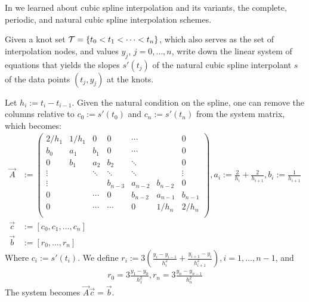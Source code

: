 
\begin{problem} \label{prb:NatCubicSplines}
  In  we learned about cubic spline interpolation and its variants,
  the complete, periodic, and natural cubic spline interpolation schemes. 
  
  \begin{subproblem}[1]
    \label{csi:sp1}
    Given a knot set {${\cal T}=\{t_{0}<t_{1}<\dots<t_{n}\}$}, which also serves
    as the set of interpolation nodes, and values {$y_{j}$},
    {$j=0,\ldots,n$}, write down the linear system of equations that yields
    the slopes $s'(t_{j})$ of the natural cubic spline interpolant $s$ of the data
    points $(t_{j},y_{j})$ at the knots.
    
  \begin{solution}
   Let $h_i := t_i - t_{i-1}$. Given the natural condition on the spline, one can remove the columns relative to $c_0 := s'(t_0)$ and $c_n := s'(t_n)$ from the system matrix, which becomes:
   \newcommand{\squarelineheight}{0.9ex}
   \begin{align}
    \vec{A} & := \begin{pmatrix}
                2 / h_1 & 1 / h_1 & 0 & 0 & \cdots & & 0 \\[\squarelineheight]
                b_0 & a_1 & b_1 & 0 & \cdots & & 0 \\[\squarelineheight]
                0 & b_1 & a_2 & b_2 & \ddots & & 0 \\[\squarelineheight]
                \vdots & & \ddots & \ddots & \ddots & & \vdots \\[\squarelineheight]
                \vdots & &  & b_{n-3} & a_{n-2} & b_{n-2} & 0 \\[\squarelineheight]
                0 & & \cdots & 0 & b_{n-2} & a_{n-1} & b_{n-1} \\[\squarelineheight]
                0 & & \cdots & \cdots & 0 & 1 / h_n & 2 / h_n \\
               \end{pmatrix}, a_i := \frac{2}{h_i} + \frac{2}{h_{i+1}}, b_i := \frac{1}{h_{i+1}} \\
    \vec{c} & := [ c_0, c_1, \dots, c_{n} ] \\
    \vec{b} & := [ r_0, \dots, r_{n} ]
   \end{align}
  Where $c_i := s'(t_i)$. We define $r_i := 3 \left( \frac{y_{i} - y_{i-1}}{h_{i}^2} + \frac{y_{i+1} - y_{i}}{h_{i+1}^2} \right), i = 1, \dots, n-1$, and
  \begin{align*}
   r_0 = 3 \frac{y_1 - y_0}{h_1^2}, r_n = 3 \frac{y_n - y_{n-1}}{h_n^2}
  \end{align*}
  The system becomes $\vec{A}\vec{c} = \vec{b}$.
  \end{solution}
  \end{subproblem}
  



\end{problem}
